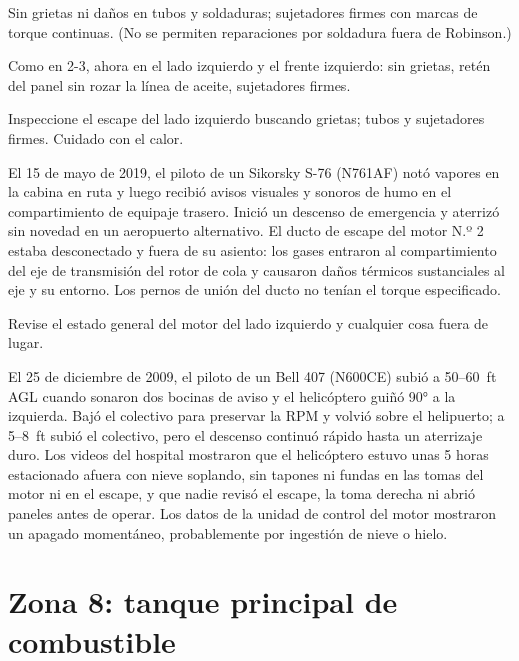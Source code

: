 Sin grietas ni daños en tubos y soldaduras; sujetadores firmes con marcas de torque continuas. (No se permiten reparaciones por soldadura fuera de Robinson.)

Como en 2-3, ahora en el lado izquierdo y el frente izquierdo: sin grietas, retén del panel sin rozar la línea de aceite, sujetadores firmes.

Inspeccione el escape del lado izquierdo buscando grietas; tubos y sujetadores firmes. Cuidado con el calor.

\begin{caso}
El 15 de mayo de 2019, el piloto de un Sikorsky S-76 (N761AF) notó vapores en la cabina en ruta y luego recibió avisos visuales y sonoros de humo en el compartimiento de equipaje trasero. Inició un descenso de emergencia y aterrizó sin novedad en un aeropuerto alternativo. El ducto de escape del motor N.º 2 estaba desconectado y fuera de su asiento: los gases entraron al compartimiento del eje de transmisión del rotor de cola y causaron daños térmicos sustanciales al eje y su entorno. Los pernos de unión del ducto no tenían el torque especificado.
\end{caso}

Revise el estado general del motor del lado izquierdo y cualquier cosa fuera de lugar.

\begin{caso}
El 25 de diciembre de 2009, el piloto de un Bell 407 (N600CE) subió a 50--60~ft AGL cuando sonaron dos bocinas de aviso y el helicóptero guiñó 90° a la izquierda. Bajó el colectivo para preservar la RPM y volvió sobre el helipuerto; a 5--8~ft subió el colectivo, pero el descenso continuó rápido hasta un aterrizaje duro. Los videos del hospital mostraron que el helicóptero estuvo unas 5 horas estacionado afuera con nieve soplando, sin tapones ni fundas en las tomas del motor ni en el escape, y que nadie revisó el escape, la toma derecha ni abrió paneles antes de operar. Los datos de la unidad de control del motor mostraron un apagado momentáneo, probablemente por ingestión de nieve o hielo.
\end{caso}

\section{Zona 8: tanque principal de combustible}

